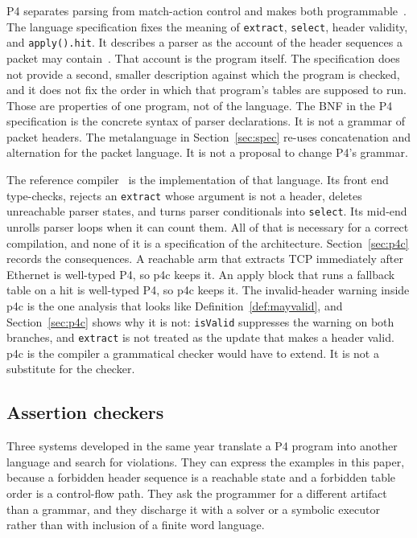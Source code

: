 \documentclass[a4paper,UKenglish,cleveref,autoref]{lipics-v2021}
\begin{document}
P4 separates parsing from match-action control and makes both programmable~\cite{bosshart2014p4,p4langspec}.
The language specification fixes the meaning of \texttt{extract}, \texttt{select}, header validity, and \texttt{apply().hit}.
It describes a parser as the account of the header sequences a packet may contain~\cite{p4langspec}.
That account is the program itself.
The specification does not provide a second, smaller description against which the program is checked, and it does not fix the order in which that program's tables are supposed to run.
Those are properties of one program, not of the language.
The BNF in the P4 specification is the concrete syntax of parser declarations.
It is not a grammar of packet headers.
The metalanguage in Section~\ref{sec:spec} re-uses concatenation and alternation for the packet language.
It is not a proposal to change P4's grammar.

The reference compiler~\cite{p4c} is the implementation of that language.
Its front end type-checks, rejects an \texttt{extract} whose argument is not a header, deletes unreachable parser states, and turns parser conditionals into \texttt{select}.
Its mid-end unrolls parser loops when it can count them.
All of that is necessary for a correct compilation, and none of it is a specification of the architecture.
Section~\ref{sec:p4c} records the consequences.
A reachable arm that extracts TCP immediately after Ethernet is well-typed P4, so p4c keeps it.
An apply block that runs a fallback table on a hit is well-typed P4, so p4c keeps it.
The invalid-header warning inside p4c is the one analysis that looks like Definition~\ref{def:mayvalid}, and Section~\ref{sec:p4c} shows why it is not: \texttt{isValid} suppresses the warning on both branches, and \texttt{extract} is not treated as the update that makes a header valid.
p4c is the compiler a grammatical checker would have to extend.
It is not a substitute for the checker.

\subsection{Assertion checkers}

Three systems developed in the same year translate a P4 program into another language and search for violations.
They can express the examples in this paper, because a forbidden header sequence is a reachable state and a forbidden table order is a control-flow path.
They ask the programmer for a different artifact than a grammar, and they discharge it with a solver or a symbolic executor rather than with inclusion of a finite word language.
\end{document}

